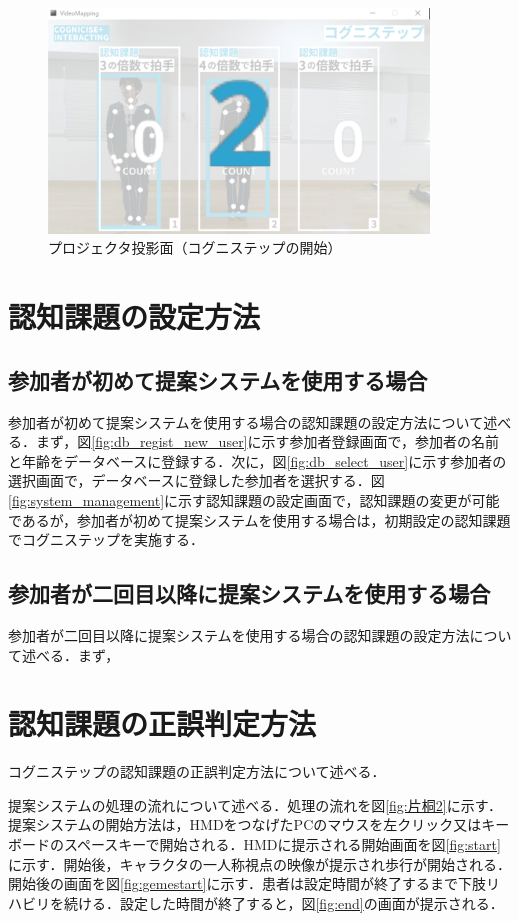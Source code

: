\begin{figure}[tbp]
	\centering
			\includegraphics[width=0.9\textwidth]{chap2-figure/vm_start.eps}
	\caption{プロジェクタ投影面（コグニステップの開始）}
	\label{fig:vm_start}
\end{figure}
\fi

\section{認知課題の設定方法}
\subsection{参加者が初めて提案システムを使用する場合}
参加者が初めて提案システムを使用する場合の認知課題の設定方法について述べる．まず，図\ref{fig:db_regist_new_user}に示す参加者登録画面で，参加者の名前と年齢をデータベースに登録する．次に，図\ref{fig:db_select_user}に示す参加者の選択画面で，データベースに登録した参加者を選択する．図\ref{fig:system_management}に示す認知課題の設定画面で，認知課題の変更が可能であるが，参加者が初めて提案システムを使用する場合は，初期設定の認知課題でコグニステップを実施する．

\subsection{参加者が二回目以降に提案システムを使用する場合}
参加者が二回目以降に提案システムを使用する場合の認知課題の設定方法について述べる．まず，

\section{認知課題の正誤判定方法}
コグニステップの認知課題の正誤判定方法について述べる．

提案システムの処理の流れについて述べる．処理の流れを図\ref{fig:片桐2}に示す．
提案システムの開始方法は，HMDをつなげたPCのマウスを左クリック又はキーボードのスペースキーで開始される．HMDに提示される開始画面を図\ref{fig:start}に示す．開始後，キャラクタの一人称視点の映像が提示され歩行が開始される．開始後の画面を図\ref{fig:gemestart}に示す．患者は設定時間が終了するまで下肢リハビリを続ける．設定した時間が終了すると，図\ref{fig:end}の画面が提示される．
\fi

